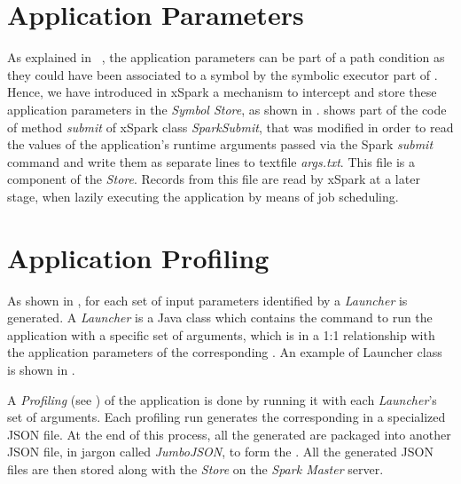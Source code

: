 \section{Application Parameters}\label{sec:application_parameters}
As explained in ~, the application parameters can be part of a path condition as they could have been associated to a symbol by the symbolic executor part of \dSymb. Hence, we have introduced in xSpark a mechanism to intercept and store these application parameters in the \tool \textit{Symbol Store}, as shown in .   shows part of the code of method \textit{submit} of xSpark class \textit{SparkSubmit}, that was modified in order to read the values of the application's runtime arguments passed via the Spark \textit{submit} command and write them as separate lines to textfile \textit{args.txt}. This file is a component of the \textit{\model Store}. Records from this file are read by xSpark at a later stage, when lazily executing the application by means of job scheduling.
 


\section{Application Profiling}\label{sec:application_profiling}
As shown in , for each set of input parameters identified by \dSymb a \textit{Launcher} is generated. A \textit{Launcher} is a Java class which contains the command to run the application with a specific set of arguments, which is in a 1:1 relationship with the application parameters of the corresponding \plan. An example of Launcher class is shown in . 

A \textit{Profiling} (see 
) of the application is done by running it with each \textit{Launcher}'s set of arguments. Each profiling run generates the corresponding \plan in a specialized JSON file. At the end of this process, all the generated \plans are packaged into another JSON file, in jargon called \textit{JumboJSON}, to form the \model. All the generated JSON files are then stored along with the \model \textit{Store} on the \textit{Spark Master} server. 



